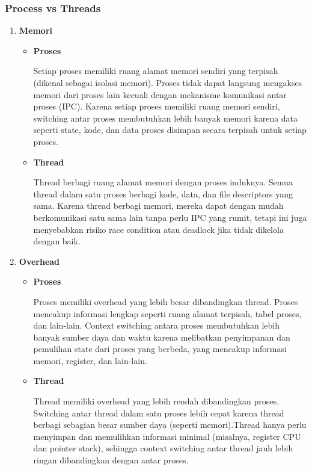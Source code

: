 \documentclass[12pt]{article}
\begin{document}
    \subsubsection{Process vs Threads}
    \begin{enumerate}
        \item\textbf{Memori}
        \begin{itemize}
            \item\textbf{Proses} 
            \par \hspace{2em} Setiap proses memiliki ruang alamat memori sendiri yang terpisah (dikenal sebagai isolasi memori). Proses tidak dapat langsung mengakses memori dari proses lain kecuali dengan mekanisme komunikasi antar proses (IPC). Karena setiap proses memiliki ruang memori sendiri, switching antar proses membutuhkan lebih banyak memori karena data seperti state, kode, dan data proses disimpan secara terpisah untuk setiap proses.
            \item\textbf{Thread}
            \par \hspace{2em} Thread berbagi ruang alamat memori dengan proses induknya. Semua thread dalam satu proses berbagi kode, data, dan file descriptors yang sama. Karena thread berbagi memori, mereka dapat dengan mudah berkomunikasi satu sama lain tanpa perlu IPC yang rumit, tetapi ini juga menyebabkan risiko race condition atau deadlock jika tidak dikelola dengan baik.
        \end{itemize}
        \item\textbf{Overhead} 
        \begin{itemize}
            \item\textbf{Proses} 
            \par \hspace{2em} Proses memiliki overhead yang lebih besar dibandingkan thread. Proses mencakup informasi lengkap seperti ruang alamat terpisah, tabel proses, dan lain-lain. Context switching antara proses membutuhkan lebih banyak sumber daya dan waktu karena melibatkan penyimpanan dan pemulihan state dari proses yang berbeda, yang mencakup informasi memori, register, dan lain-lain.
            \item\textbf{Thread}
            \par \hspace{2em} Thread memiliki overhead yang lebih rendah dibandingkan proses. Switching antar thread dalam satu proses lebih cepat karena thread berbagi sebagian besar sumber daya (seperti memori).Thread hanya perlu menyimpan dan memulihkan informasi minimal (misalnya, register CPU dan pointer stack), sehingga context switching antar thread jauh lebih ringan dibandingkan dengan antar proses.

\end{itemize}
\end{enumerate}
\end{document}
